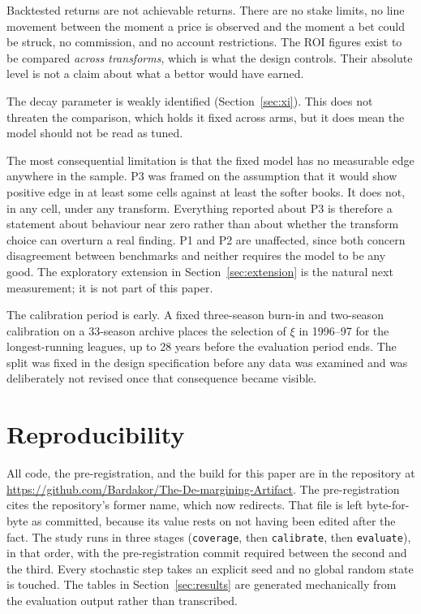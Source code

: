 \documentclass[11pt,a4paper]{article}
\begin{document}
Backtested returns are not achievable returns. There are no stake limits, no
line movement between the moment a price is observed and the moment a bet could
be struck, no commission, and no account restrictions. The ROI figures exist to
be compared \emph{across transforms}, which is what the design controls. Their
absolute level is not a claim about what a bettor would have earned.

The decay parameter is weakly identified (Section~\ref{sec:xi}). This does not
threaten the comparison, which holds it fixed across arms, but it does mean the
model should not be read as tuned.

The most consequential limitation is that the fixed model has no measurable
edge anywhere in the sample. P3 was framed on the assumption that it would show
positive edge in at least some cells against at least the softer books. It does
not, in any cell, under any transform. Everything reported about P3 is
therefore a statement about behaviour near zero rather than about whether the
transform choice can overturn a real finding. P1 and P2 are unaffected, since
both concern disagreement between benchmarks and neither requires the model to
be any good. The exploratory extension in Section~\ref{sec:extension} is the
natural next measurement; it is not part of this paper.

The calibration period is early. A fixed three-season burn-in and two-season
calibration on a 33-season archive places the selection of $\xi$ in 1996--97
for the longest-running leagues, up to 28 years before the evaluation period
ends. The split was fixed in the design specification before any data was
examined and was deliberately not revised once that consequence became
visible.

\section{Reproducibility}
\label{sec:repro}

All code, the pre-registration, and the build for this paper are in the
repository at \url{https://github.com/Bardakor/The-De-margining-Artifact}. The
pre-registration cites the repository's former name, which now redirects. That
file is left byte-for-byte as committed, because its value rests on not having
been edited after the fact. The study runs
in three stages (\texttt{coverage}, then \texttt{calibrate}, then
\texttt{evaluate}), in that order, with the pre-registration commit required between the second and
the third. Every stochastic step takes an explicit seed and no global random
state is touched. The tables in Section~\ref{sec:results} are generated
mechanically from the evaluation output rather than transcribed.
\end{document}
